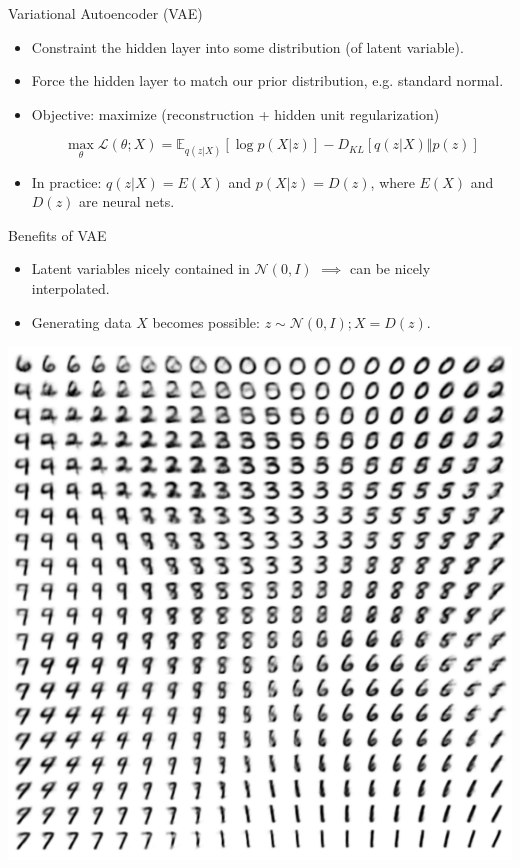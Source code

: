 \documentclass{beamer}
\begin{document}
    \begin{frame}{Variational Autoencoder (VAE)}

        \begin{itemize}
            \item Constraint the hidden layer into some distribution (of latent variable).
            \item Force the hidden layer to match our prior distribution, e.g. standard normal.
            \item Objective: maximize (reconstruction + hidden unit regularization)

            $$\max_{\theta} \mathcal{L}(\theta;X) = \mathbb{E}_{q(z \vert X)}[\log p(X \vert z)] - D_{KL}[q(z \vert X) \Vert p(z)]$$

            \item In practice: $q(z \vert X) = E(X)$ and $p(X \vert z) = D(z)$, where $E(X)$ and $D(z)$ are neural nets.
        \end{itemize}

    \end{frame}

    \begin{frame}{Benefits of VAE}
        \begin{itemize}
            \item Latent variables nicely contained in $\mathcal{N}(0, I)$ $\implies$ can be nicely interpolated.
            \item Generating data $X$ becomes possible: $z \sim \mathcal{N}(0, I); X = D(z)$.
        \end{itemize}

        \includegraphics{vaeinterpolation}
    \end{frame}
\end{document}
